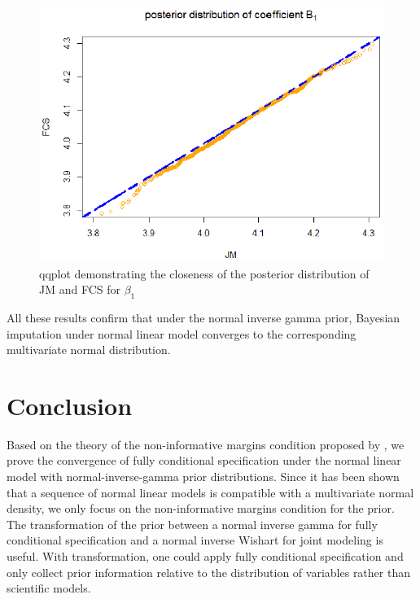 	\begin{figure}[h]
		\centering
		\includegraphics[scale=0.7]{plots/plot5.1.eps}
		\caption{qqplot demonstrating the closeness of the posterior distribution of JM and FCS for $\beta_{1}$}
		\label{fig5_1}
	\end{figure} 
	
	All these results confirm that under the normal inverse gamma prior, Bayesian imputation under normal linear model converges to the corresponding multivariate normal distribution. 
	
	\section{Conclusion}
	Based on the theory of the non-informative margins condition proposed by \citet{hughes2014joint}, we prove the convergence of fully conditional specification under the normal linear model with normal-inverse-gamma prior distributions. Since it has been shown that a sequence of normal linear models is compatible with a multivariate normal density, we only focus on the non-informative margins condition for the prior. The transformation of the prior between a normal inverse gamma for fully conditional specification and a normal inverse Wishart for joint modeling is useful. With transformation, one could apply fully conditional specification and only collect prior information relative to the distribution of variables rather than scientific models.  
	
